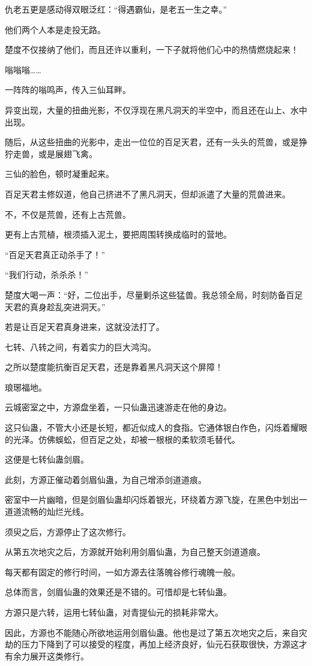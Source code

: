 \begin{this_body}
仇老五更是感动得双眼泛红：“得遇霸仙，是老五一生之幸。”

他们两个人本是走投无路。

楚度不仅接纳了他们，而且还许以重利，一下子就将他们心中的热情燃烧起来！

嗡嗡嗡……

一阵阵的嗡鸣声，传入三仙耳畔。

异变出现，大量的扭曲光影，不仅浮现在黑凡洞天的半空中，而且还在山上、水中出现。

随后，从这些扭曲的光影中，走出一位位的百足天君，还有一头头的荒兽，或是狰狞走兽，或是展翅飞禽。

三仙的脸色，顿时凝重起来。

百足天君主修奴道，他自己挤进不了黑凡洞天，但却派遣了大量的荒兽进来。

不，不仅是荒兽，还有上古荒兽。

更有上古荒植，根须插入泥土，要把周围转换成临时的营地。

“百足天君真正动杀手了！”

“我们行动，杀杀杀！”

楚度大喝一声：“好，二位出手，尽量剿杀这些猛兽。我总领全局，时刻防备百足天君的真身趁乱突进洞天。”

若是让百足天君真身进来，这就没法打了。

七转、八转之间，有着实力的巨大鸿沟。

之所以楚度能抗衡百足天君，还是靠着黑凡洞天这个屏障！

琅琊福地。

云城密室之中，方源盘坐着，一只仙蛊迅速游走在他的身边。

这只仙蛊，不管大小还是长短，都近似成人的食指。它通体银白作色，闪烁着耀眼的光泽。仿佛蜈蚣，但百足之处，却被一根根的柔软须毛替代。

这便是七转仙蛊剑眉。

此刻，方源正催动着剑眉仙蛊，为自己增添剑道道痕。

密室中一片幽暗，但是剑眉仙蛊却闪烁着银光，环绕着方源飞旋，在黑色中划出一道道流畅的灿烂光线。

须臾之后，方源停止了这次修行。

从第五次地灾之后，方源就开始利用剑眉仙蛊，为自己整天剑道道痕。

每天都有固定的修行时间，一如方源去往落魄谷修行魂魄一般。

总体而言，剑眉仙蛊的效果还是不错的。可惜却是七转仙蛊。

方源只是六转，运用七转仙蛊，对青提仙元的损耗非常大。

因此，方源也不能随心所欲地运用剑眉仙蛊。他也是过了第五次地灾之后，来自灾劫的压力下降到了可以接受的程度，再加上经济良好，仙元石获取很快，方源这才有余力展开这类修行。


\end{this_body}
